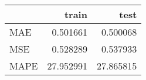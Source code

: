 \begin{tabular}{lrr}
\toprule
{} &      train &       test \\
\midrule
MAE  &   0.501661 &   0.500068 \\
MSE  &   0.528289 &   0.537933 \\
MAPE &  27.952991 &  27.865815 \\
\bottomrule
\end{tabular}
